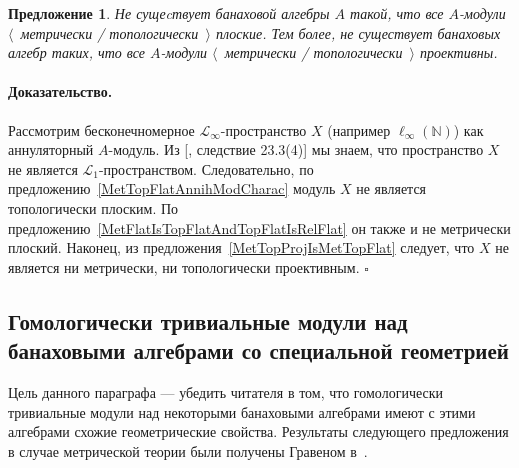 \documentclass[12pt]{article}
\newtheorem{proposition}[theorem]{Предложение}
\renewenvironment{proof}{\paragraph{Доказательство.}}{\hfill$\square$\medskip}
\begin{document}
\begin{proposition} Не сущеcтвует банаховой алгебры $A$ такой, что все
    $A$-модули $\langle$~метрически / топологически~$\rangle$ плоские. Тем
    более, не существует банаховых алгебр таких, что все $A$-модули
    $\langle$~метрически / топологически~$\rangle$ проективны.
\end{proposition}
\begin{proof} Рассмотрим бесконечномерное $\mathscr{L}_\infty$-пространство $X$
    (например $\ell_\infty(\mathbb{N})$) как аннуляторный $A$-модуль. Из
    [\cite{DefFloTensNorOpId}, следствие 23.3(4)] мы знаем, что пространство $X$
    не является $\mathscr{L}_1$-пространством. Следовательно, по
    предложению~\ref{MetTopFlatAnnihModCharac} модуль $X$ не является
    топологически плоским. По
    предложению~\ref{MetFlatIsTopFlatAndTopFlatIsRelFlat} он также и не
    метрически плоский. Наконец, из предложения~\ref{MetTopProjIsMetTopFlat}
    следует, что $X$ не является ни метрически, ни топологически проективным.
\end{proof}


\subsection{Гомологически тривиальные модули над банаховыми алгебрами со
    специальной
    геометрией}\label{SubSectionHomologicallyTrivialModulesOverBanachAlgebrasWithSpecificGeometry}

Цель данного параграфа --- убедить читателя в том, что гомологически тривиальные
модули над некоторыми банаховыми алгебрами имеют с этими алгебрами схожие
геометрические свойства. Результаты следующего предложения в случае метрической
теории были получены Гравеном в~\cite{GravInjProjBanMod}.
\end{document}
